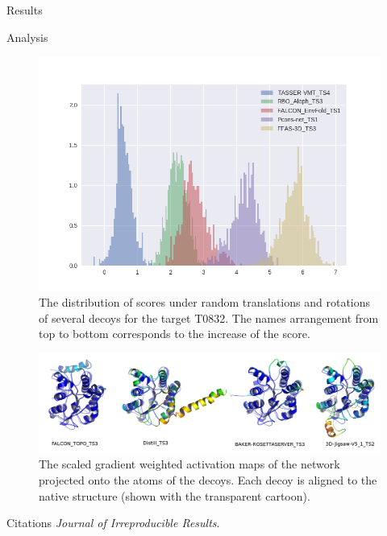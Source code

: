 \documentclass[final, unknownkeysallowed]{beamer}
\begin{document}
\begin{frame}{}
\begin{textblock}{19.3}
\begin{block}{Results}
\end{block}

\begin{block}{Analysis}
\begin{figure}[H]
    \centering
    \includegraphics[width=\linewidth]{../draft/Fig/decoys_sampling_dist.png}
    \caption{The distribution of scores under random translations and rotations of several decoys for the target T0832. The 
    names arrangement from top to bottom corresponds to the increase of the score.}
    \label{Fig:DecoysScoreDistribution}
\end{figure}
\begin{figure}[H]
    \centering
    \includegraphics[width=\linewidth]{../draft/Fig/T0776.png}
    \caption{The scaled gradient weighted activation maps of the network projected onto the atoms of the decoys. 
    Each decoy is aligned to the native structure (shown with the transparent cartoon).}
    \label{Fig:GradCAMT0776_more}
\end{figure}
\end{block}


\begin{block}{Citations}
\emph{Journal of Irreproducible Results}.
\end{block}

\end{textblock}

\end{frame}
\end{document}
